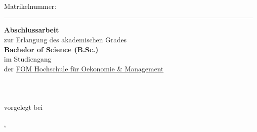 \begin{titlepage}
\begin{center}
\begin{spacing}{1.8}
    {\sffamily\bfseries\LARGE\daTitelEins}\\ %
    {\sffamily\bfseries\LARGE\daTitelZwei}\\ %
	{\sffamily\LARGE\daAutor}\\ %
	{\sffamily\large Matrikelnummer: \daMatrikelnummer}\\ %
  \end{spacing}%
  \hrule
  \begin{spacing}{1.1}
    {\sffamily\bfseries\Large Abschlussarbeit}\\ %
    {\large zur Erlangung des akademischen Grades}\\
    {\large\bfseries Bachelor of Science (B.Sc.)}\\
  	{\large im Studiengang {\large \daStudiengang}} \\%
  	{\large der \href{\daUniURL}{FOM Hochschule für Oekonomie \& Management}} \\%
    {\normalsize\daAutor}\\%
    {\normalsize\daAutorAdresse}\\%
    {\normalsize\daAutorPLZ~\daAutorOrt}\\%
    {\small vorgelegt bei}\\%
    {\normalsize\daGutachterEins}\par%
  \end{spacing}
  {\normalsize \daAutorOrt, \daDate}
\end{center}


\end{titlepage}
